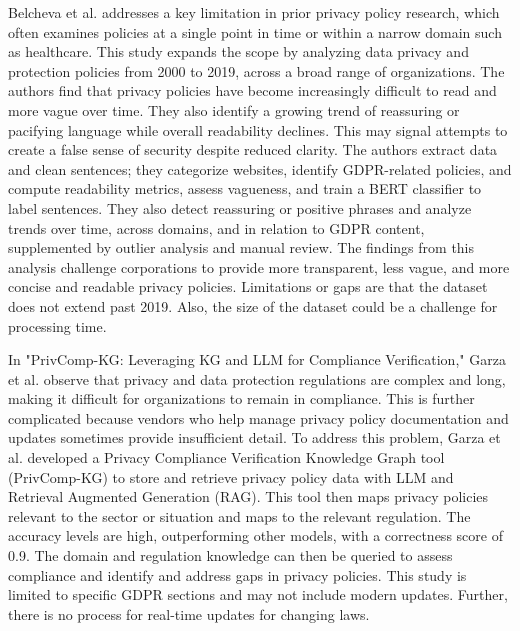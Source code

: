 \documentclass[conference]{IEEEtran}
\begin{document}
Belcheva et al. \cite{belcheva2023} addresses a key limitation in prior privacy policy research, which often examines policies at a single point in time or within a narrow domain such as healthcare. This study expands the scope by analyzing data privacy and protection policies from 2000 to 2019, across a broad range of organizations. The authors find that privacy policies have become increasingly difficult to read and more vague over time. They also identify a growing trend of reassuring or pacifying language while overall readability declines. This may signal attempts to create a false sense of security despite reduced clarity. The authors extract data and clean sentences; they categorize websites, identify GDPR-related policies, and compute readability metrics, assess vagueness, and train a BERT classifier to label sentences. They also detect reassuring or positive phrases and analyze trends over time, across domains, and in relation to GDPR content, supplemented by outlier analysis and manual review. The findings from this analysis challenge corporations to provide more transparent, less vague, and more concise and readable privacy policies. 
Limitations or gaps are that the dataset does not extend past 2019. Also, the size of the dataset could be a challenge for processing time. 

In "PrivComp-KG: Leveraging KG and LLM for Compliance Verification," Garza et al. \cite{garza2024} observe that privacy and data protection regulations are complex and long, making it difficult for organizations to remain in compliance. This is further complicated because vendors who help manage privacy policy documentation and updates sometimes provide insufficient detail. To address this problem, Garza et al.\cite{garza2024} developed a Privacy Compliance Verification Knowledge Graph tool (PrivComp-KG) to store and retrieve privacy policy data with LLM and Retrieval Augmented Generation (RAG). This tool then maps privacy policies relevant to the sector or situation and maps to the relevant regulation. 
The accuracy levels are high, outperforming other models, with a correctness score of 0.9. The domain and regulation knowledge can then be queried to assess compliance and identify and address gaps in privacy policies. This study is limited to specific GDPR sections and may not include modern updates. Further, there is no process for real-time updates for changing laws. 
\end{document}
